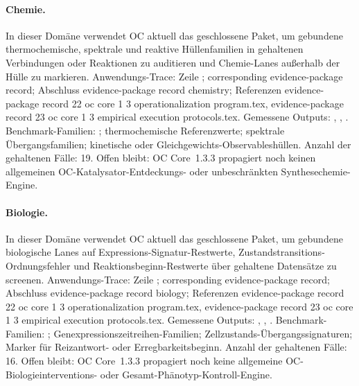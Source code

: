 \paragraph{Chemie.}
In dieser Domäne verwendet OC aktuell das geschlossene Paket, um gebundene thermochemische, spektrale und reaktive Hüllenfamilien in gehaltenen Verbindungen oder Reaktionen zu auditieren und Chemie-Lanes außerhalb der Hülle zu markieren.
Anwendungs-Trace: Zeile ; corresponding evidence-package record; \allowbreak Abschluss evidence-package record chemistry; \allowbreak Referenzen evidence-package record 22 oc core 1 3 operationalization program.tex, \allowbreak evidence-package record 23 oc core 1 3 empirical execution protocols.tex.
Gemessene Outputs: , , .
Benchmark-Familien: ; thermochemische Referenzwerte; spektrale Übergangsfamilien; kinetische oder Gleichgewichts-\allowbreak Observableshüllen.
Anzahl der gehaltenen Fälle: 19.
Offen bleibt: OC Core~1.3.3 propagiert noch keinen allgemeinen OC-Katalysator-Entdeckungs- oder unbeschränkten Synthesechemie-Engine.

\paragraph{Biologie.}
In dieser Domäne verwendet OC aktuell das geschlossene Paket, um gebundene biologische Lanes auf Expressions-Signatur-Restwerte, Zustandstransitions-Ordnungsfehler und Reaktionsbeginn-Restwerte über gehaltene Datensätze zu screenen.
Anwendungs-Trace: Zeile ; corresponding evidence-package record; \allowbreak Abschluss evidence-package record biology; \allowbreak Referenzen evidence-package record 22 oc core 1 3 operationalization program.tex, \allowbreak evidence-package record 23 oc core 1 3 empirical execution protocols.tex.
Gemessene Outputs: , , .
Benchmark-Familien: ; Genexpressionszeitreihen-Familien; Zellzustands-\allowbreak Übergangssignaturen; Marker für Reizantwort- oder Erregbarkeitsbeginn.
Anzahl der gehaltenen Fälle: 16.
Offen bleibt: OC Core~1.3.3 propagiert noch keine allgemeine OC-Biologieinterventions- oder Gesamt-Phänotyp-Kontroll-Engine.

